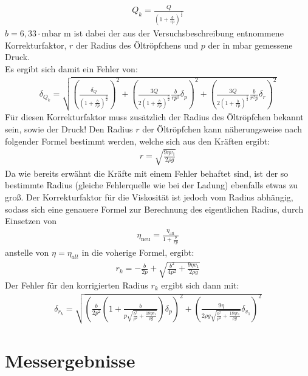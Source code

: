 \documentclass[12pt]{scrartcl}
\begin{document}
\begin{align}
Q_k = \frac{Q}{\left(1+\frac{b}{rp}\right)^{\frac{3}{2}}}
\label{eqn:q_r}
\end{align}
$ b = 6,33 \cdot \text{mbar m}$ ist dabei der aus der Versuchsbeschreibung entnommene Korrekturfaktor, $r$ der Radius des Öltröpfchens und $p$ der in mbar gemessene Druck.\\
Es ergibt sich damit ein Fehler von:
\begin{align}
\delta_{Q_k} = \sqrt{
\left(\frac{\delta_Q}{\left(1+\frac{b}{rp}\right)^{\frac{3}{2}}}\right)^2+
\left(\frac{3Q}{2\left(1+\frac{b}{rp}\right)^{\frac{5}{2}}}\frac{b}{rp^2}\delta_p\right)^2+
\left(\frac{3Q}{2\left(1+\frac{b}{rp}\right)^{\frac{5}{2}}}\frac{b}{r^2p}\delta_r\right)^2
}
\label{eqn:q_r_sigma}
\end{align}
Für diesen Korrekturfaktor muss zusätzlich der Radius des Öltröpfchen bekannt sein, sowie der Druck!
Den Radius $r$ der Öltröpfchen kann näherungsweise nach folgender Formel bestimmt werden, welche sich aus den Kräften ergibt:
\begin{align}
r = \sqrt{\frac{9\eta v_1}{2\rho g}}
\end{align}
Da wie bereits erwähnt die Kräfte mit einem Fehler behaftet sind, ist der so bestimmte Radius (gleiche Fehlerquelle wie bei der Ladung) ebenfalls etwas zu groß. Der Korrekturfaktor für die Viskosität ist jedoch vom Radius abhängig, sodass sich eine genauere Formel zur Berechnung des eigentlichen Radius, durch Einsetzen von 
\begin{align}
\eta_{\text{neu}} = \frac{\eta_{\text{alt}}}{1+\frac{b}{rp}}
\end{align} 
anstelle von $\eta = \eta_{alt}$ in die voherige Formel, ergibt:
\begin{align}
r_k = -\frac{b}{2p}+\sqrt{\frac{b^2}{4p^2}+\frac{9\eta v_1}{2\rho g}}
\label{eqn:r_k}
\end{align}
Der Fehler für den korrigierten Radius $r_k$ ergibt sich dann mit:
\begin{align}
\delta_{r_k} = \sqrt{
\left(\frac{b}{2p^2}\left(1+\frac{b}{p\sqrt{\frac{b^2}{p^2}+\frac{18\eta v_1}{\rho g}}}\right)\delta_p\right)^2+
\left(\frac{9\eta}{2\rho g\sqrt{\frac{b^2}{p^2}+\frac{18\eta v_1}{\rho g}}}\delta_{v_1}\right)^2}
\label{eqn:r_k_sigma}
\end{align}
\section{Messergebnisse}
\end{document}
